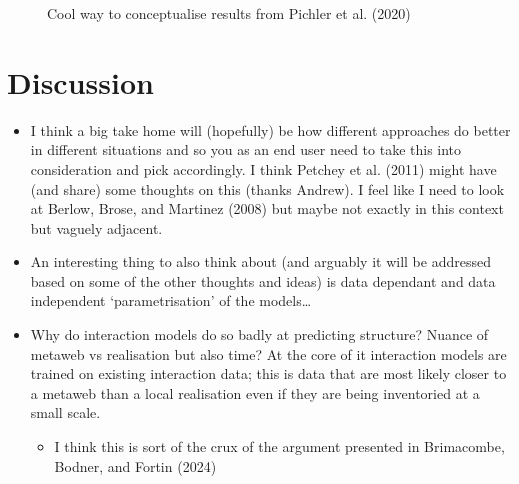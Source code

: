 \documentclass[
  letterpaper,
  DIV=11,
  numbers=noendperiod]{scrartcl}
\providecommand{\tightlist}{%
  \setlength{\itemsep}{0pt}\setlength{\parskip}{0pt}}\usepackage{longtable,booktabs,array}
\begin{document}
\begin{figure}


\caption{\label{fig-pichler}Cool way to conceptualise results from
Pichler et al. (2020)}

\end{figure}%

\section{Discussion}\label{discussion}

\begin{itemize}
\item
  I think a big take home will (hopefully) be how different approaches
  do better in different situations and so you as an end user need to
  take this into consideration and pick accordingly. I think Petchey et
  al. (2011) might have (and share) some thoughts on this (thanks
  Andrew). I feel like I need to look at Berlow, Brose, and Martinez
  (2008) but maybe not exactly in this context but vaguely adjacent.
\item
  An interesting thing to also think about (and arguably it will be
  addressed based on some of the other thoughts and ideas) is data
  dependant and data independent `parametrisation' of the models\ldots{}
\item
  Why do interaction models do so badly at predicting structure? Nuance
  of metaweb vs realisation but also time? At the core of it interaction
  models are trained on existing interaction data; this is data that are
  most likely closer to a metaweb than a local realisation even if they
  are being inventoried at a small scale.

  \begin{itemize}
  \tightlist
  \item
    I think this is sort of the crux of the argument presented in
    Brimacombe, Bodner, and Fortin (2024)
  \end{itemize}
\end{itemize}
\end{document}
